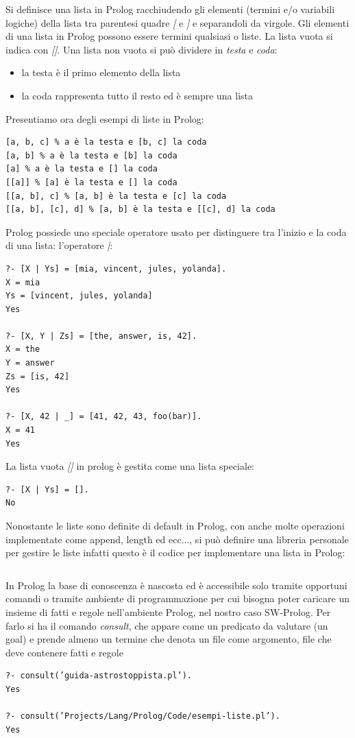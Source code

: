 \documentclass[a4paper]{report}
\begin{document}
Si definisce una lista in Prolog racchiudendo gli elementi (termini e/o variabili logiche) della lista tra parentesi quadre \textit{[} e \textit{]}
e separandoli da virgole. Gli elementi di una lista in Prolog possono essere termini
qualsiasi o liste. La lista vuota si indica con \textit{[]}.
Una lista non vuota si può dividere in \textit{testa} e \textit{coda}:
\begin{itemize}
\item la testa è il primo elemento della lista
\item la coda rappresenta tutto il resto ed è sempre una lista
\end{itemize}
Presentiamo ora degli esempi di liste in Prolog:
\begin{verbatim}
[a, b, c] % a è la testa e [b, c] la coda
[a, b] % a è la testa e [b] la coda
[a] % a è la testa e [] la coda
[[a]] % [a] è la testa e [] la coda
[[a, b], c] % [a, b] è la testa e [c] la coda
[[a, b], [c], d] % [a, b] è la testa e [[c], d] la coda
\end{verbatim}
Prolog possiede uno speciale operatore usato per distinguere tra l'inizio e la coda di una lista: l'operatore \textit{|}:
\begin{verbatim}
?- [X | Ys] = [mia, vincent, jules, yolanda].
X = mia
Ys = [vincent, jules, yolanda]
Yes

?- [X, Y | Zs] = [the, answer, is, 42].
X = the
Y = answer
Zs = [is, 42]
Yes

?- [X, 42 | _] = [41, 42, 43, foo(bar)].
X = 41
Yes
\end{verbatim}
La lista vuota \textit{[]} in prolog è gestita come una lista speciale:
\begin{verbatim}
?- [X | Ys] = [].
No
\end{verbatim}
Nonostante le liste sono definite di default in Prolog, con anche molte operazioni implementate come append, length ed ecc..., si può
definire una libreria personale per gestire le liste infatti questo è il codice per implementare una lista in Prolog:
\inputminted{Prolog}{esempi/liste.pl}

In Prolog la base di conoscenza è nascosta ed è accessibile solo tramite opportuni comandi o tramite ambiente di programmazione
per cui bisogna poter caricare un insieme di fatti e regole nell'ambiente Prolog, nel nostro caso SW-Prolog.
Per farlo si ha il comando \textit{consult}, che appare come un predicato da valutare (un goal) e prende almeno un termine che denota un file
come argomento, file che deve contenere fatti e regole
\begin{verbatim}
?- consult(’guida-astrostoppista.pl’).
Yes

?- consult(’Projects/Lang/Prolog/Code/esempi-liste.pl’).
Yes
\end{verbatim}
\end{document}
